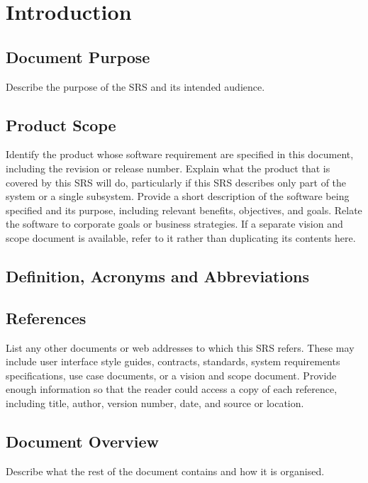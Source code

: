 \chapter{Introduction}


\section{Document Purpose}

Describe the purpose of the SRS and its intended audience.

\section{Product Scope}

Identify the product whose software requirement are specified in this document,
including the revision or release number. Explain what the product that is
covered by this SRS will do, particularly if this SRS describes only part of the
system or a single subsystem. Provide a short description of the software being
specified and its purpose, including relevant benefits, objectives, and goals.
Relate the software to corporate goals or business strategies. If a separate
vision and scope document is available, refer to it rather than duplicating its
contents here.

\section{Definition, Acronyms and Abbreviations}

\section{References}

List any other documents or web addresses to which this SRS refers. These may
include user interface style guides, contracts, standards, system requirements
specifications, use case documents, or a vision and scope document. Provide
enough information so that the reader could access a copy of each reference,
including title, author, version number, date, and source or location.

\section{Document Overview}

Describe what the rest of the document contains and how it is organised.
